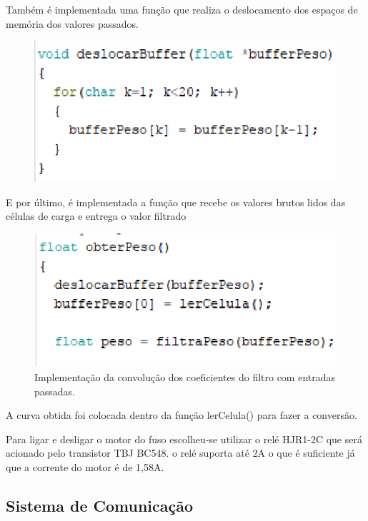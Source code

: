 Também é implementada uma função que realiza o deslocamento dos espaços de memória dos valores passados.

\begin{figure}[h]
	\centering
	\includegraphics[keepaspectratio=true,scale=0.7]{figuras/alg2}
	\label{alg2}
\end{figure}

E por último, é implementada a função que recebe os valores brutos lidos das células de carga e entrega o valor filtrado

\begin{figure}[h]
	\centering
	\includegraphics[keepaspectratio=true,scale=0.7]{figuras/alg3}
	\caption{ Implementação da convolução dos coeficientes do filtro com entradas passadas.}
	\label{alg3}
\end{figure}





A curva obtida foi colocada dentro da função lerCelula() para fazer a conversão.

Para ligar e desligar o motor do fuso escolheu-se utilizar o relé HJR1-2C que será acionado pelo transistor TBJ BC548. o relé suporta até 2A o que é suficiente já que a corrente do motor é de 1,58A.



\subsection{Sistema de Comunicação}


